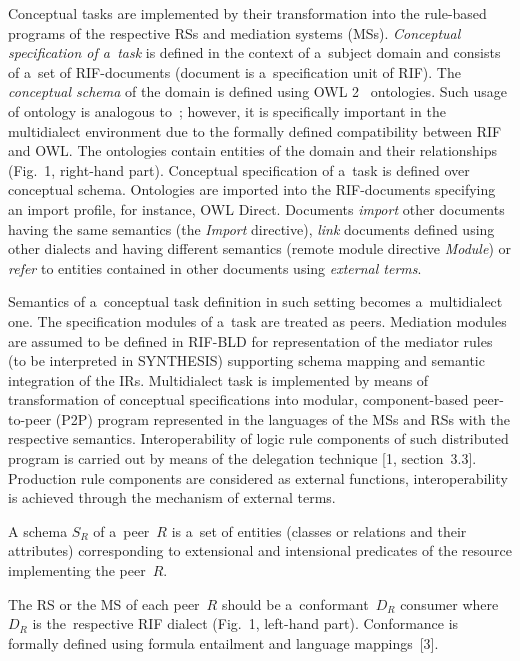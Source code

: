 \begin{multicols}{2}
Conceptual tasks are implemented by their transformation into the rule-based
programs of the respective RSs and mediation systems (MSs). \textit{Conceptual
specification of a~task} is defined in the context of a~subject domain and consists of
a~set of RIF-documents (document is a~specification unit of RIF). The
\textit{conceptual schema} of the domain is defined using OWL 2~\cite{8-kal}
ontologies. Such usage of ontology is analogous to~\cite{22-kal}; however, it is
specifically important in the multidialect environment due to the formally defined
compatibility between RIF and OWL. The ontologies contain entities of the domain
and their relationships (Fig.~1, right-hand part). Conceptual specification of a~task is
defined over conceptual schema. Ontologies are imported into the RIF-documents
specifying an import profile, for instance, {OWL Direct}. Documents
\textit{import} other documents having the same semantics (the \textit{Import}
directive), \textit{link} documents defined using other dialects and having different
semantics (remote module directive \textit{Module}) or \textit{refer} to entities
contained in other documents using \textit{external terms}.
{

}

  Semantics of a~conceptual task definition in such setting becomes a~multidialect
one. The specification modules of a~task are treated as peers. Mediation modules are
assumed to be defined in RIF-BLD for representation of the mediator rules (to be
interpreted in SYNTHESIS) supporting schema mapping and semantic integration of
the IRs. Multidialect task is implemented by means of
transformation of conceptual specifications into modular, component-based
peer-to-peer (P2P)
program represented in the languages of the MSs and RSs
with the respective semantics. Interoperability of logic rule components of such
distributed program is carried out by means of the delegation technique [1,
section~3.3]. Production rule components are considered as external functions,
interoperability is achieved through the mechanism of external terms.

  A schema $S_R$ of a~peer~$R$ is a~set of entities (classes or relations and their
attributes) corresponding to extensional and intensional predicates of the resource
implementing the peer~$R$.

  The RS or the MS of each peer~$R$ should be
a~conformant~$D_R$ consumer where~$D_R$ is the~respective RIF dialect (Fig.~1,
left-hand part). Conformance is formally defined using formula entailment and
language mappings~[3].


\end{multicols}
